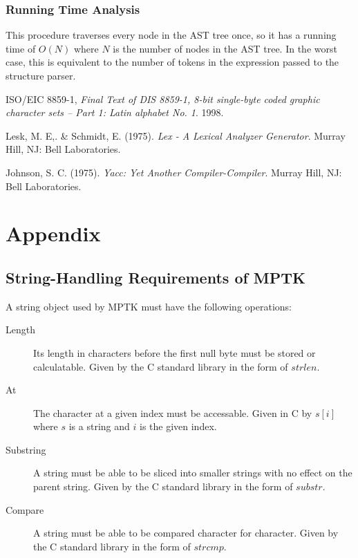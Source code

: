 \documentclass[10pt,a4paper]{article}
\begin{document}
\subsubsection{Running Time Analysis}
This procedure traverses every node in the AST tree once, so it has a running time of $O(N)$ where $N$ is the number of nodes in the AST tree. In the worst case, this is equivalent to the number of tokens in the expression passed to the structure parser.

\begin{thebibliography}{9}
	ISO/EIC 8859-1,
	\emph{Final Text of DIS 8859-1, 8-bit single-byte coded graphic character sets -- Part 1: Latin alphabet No. 1}.
	1998.

	Lesk, M. E,. \& Schmidt, E. (1975). \emph{Lex - A Lexical Analyzer Generator}. Murray Hill, NJ: Bell Laboratories.

	Johnson, S. C. (1975). \emph{Yacc: Yet Another Compiler-Compiler}. Murray Hill, NJ: Bell Laboratories.
\end{thebibliography}

\appendix
\section*{Appendix}
\renewcommand{\thesubsection}{\Alph{subsection}}

\subsection{String-Handling Requirements of MPTK}
\label{sec:StringHandlingRequirementsOfMPTK}
A string object used by MPTK must have the following operations:
\begin{description}
\item[Length] Its length in characters before the first null byte must be stored or calculatable. Given by the C standard library in the form of $strlen$.
\item[At] The character at a given index must be accessable. Given in C by $s[i]$ where $s$ is a string and $i$ is the given index.
\item[Substring] A string must be able to be sliced into smaller strings with no effect on the parent string. Given by the C standard library in the form of $substr$.
\item[Compare] A string must be able to be compared character for character. Given by the C standard library in the form of $strcmp$.
\end{description}
\end{document}
